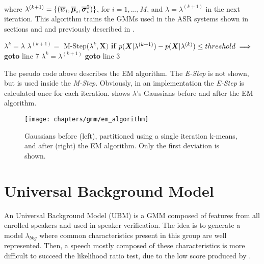 \noindent\\ where $\lambda^{(k+1)} = \{(\overline{w}_i, \overline{\boldsymbol{\mu}}_i, \overline{\boldsymbol{\sigma}}_i^2)\}$, for $i = 1, \dots, M$, and $\lambda = \lambda^{(k+1)}$ in the next iteration. This algorithm trains the GMMs used in the ASR systems shown in sections  and  and previously described in .

\begin{algorithm}
\label{em-algorithm}
\begin{algorithmic}[1]
\State $\lambda^k = \lambda$
\State $\lambda^{(k+1)} =$ M-Step($\lambda^k, \boldsymbol{X})$
\State \textbf{if} $p(\boldsymbol{X}|\lambda^{(k+1)}) - p(\boldsymbol{X}|\lambda^{(k)}) \leq threshold \implies$ \textbf{goto} line $7$
\State$\lambda^k = \lambda^{(k+1)}$
\State \textbf{goto} line $3$
\EndProcedure
\end{algorithmic}
\end{algorithm}

\noindent The pseudo code above describes the EM algorithm. The \emph{E-Step} is not shown, but is used inside the \emph{M-Step}. Obviously, in an implementation the \emph{E-Step} is calculated once for each iteration.  shows $\lambda$'s Gaussians before and after the EM algorithm.

\begin{figure}[ht]
    \centering
    \texttt{[image: chapters/gmm/em\_algorithm]}
    \caption{Gaussians before (left), partitioned using a single iteration k-means, and after (right) the EM algorithm. Only the first deviation is shown.}
    \label{fig:em_algorithm}
\end{figure}

\section{Universal Background Model}
\label{sec:ubm}

An Universal Background Model (UBM) is a GMM composed of features from all enrolled speakers and used in speaker verification. The idea is to generate a model $\lambda_{bkg}$ where common characteristics present in this group are well represented. Then, a speech mostly composed of these characteristics is more difficult to succeed the likelihood ratio test, due to the low score produced by .

